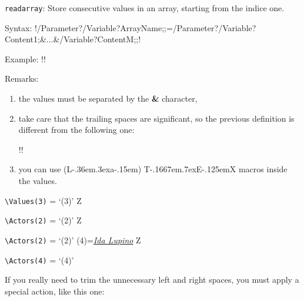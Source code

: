 \documentclass{article}
\newcommand{\AllTeX}{%
{\rm(L\kern-.36em\raise.3ex\hbox{\sc a}\kern-.15em)%
T\kern-.1667em\lower.7ex\hbox{E}\kern-.125emX}}
\newenvironment{Description}[1]{%
\begin{list}{nothing}{\setlength{\leftmargin}{#1}
\setlength{\labelwidth}{\leftmargin}\setlength{\labelsep}{1mm}}}
{\end{list}}
\newcommand{\BS}{\texttt{\symbol{`\\}}}
\newcommand{\Macro}[1]{\texttt{\BS#1}}
\newcommand{\FormatTeXMacro}[1]{\Macro{#1}\hfill :}
\begin{document}
\begin{Description}{4cm}
  \item[\FormatTeXMacro{readarray}] Store consecutive values in an array,
       starting from the indice one.

       Syntax: !\readarray/Parameter?/Variable?ArrayName;;=/Parameter?/Variable?Content1;&...&/Variable?ContentM;;!

       Example: !!

       Remarks:
       \begin{enumerate}
         \item the values must be separated by the \textbf{\&} character,
         \item take care that the trailing spaces are significant, so the
         previous definition is different from the following one:

         !!
         \item you can use \AllTeX{} macros inside the values.
       \end{enumerate}
\end{Description}

\begin{SideBySideExample}[xrightmargin=6cm]
  \newarray\Values
  \verb+\Values(3)+ = `\Values(3)'
  \newarray\Actors
  Z\par
  \verb+\Actors(2)+ = `\Actors(2)'
  Z\par
  \verb+\Actors(2)+ = `\Actors(2)'
  \Actors(4)={\textit{\underline{Ida Lupino}}}
  Z\par
  \verb+\Actors(4)+ = `\Actors(4)'
\end{SideBySideExample}

\vspace{3mm}
\noindent If you really need to trim the unnecessary left and right spaces, you must
apply a special action, like this one:
\end{document}
